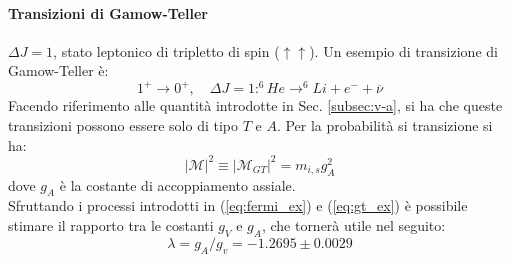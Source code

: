\documentclass{subnucbo}
\begin{document}
\paragraph{Transizioni di Gamow-Teller} $\Delta J=1$, stato leptonico di tripletto di spin ($\uparrow\uparrow$). Un esempio di transizione di Gamow-Teller è:
\begin{equation}
        1 ^ { + } \rightarrow 0 ^ { + } , \quad \Delta J = 1 : ^{6}H e \rightarrow^ { 6 } L i + e ^ { - } + \overline { \nu }
        \label{eq:gt_ex}
\end{equation}
Facendo riferimento alle quantità introdotte in Sec. \ref{subsec:v-a}, si ha che queste transizioni possono essere solo di tipo $T$ e $A$. Per la probabilità si transizione si ha:
\begin{equation}
        | \mathcal { M } | ^ { 2 } \equiv \left| \mathcal { M } _ { G T } \right| ^ { 2 } = m _ { i , s } g _ { A } ^ { 2 }
        \label{eq:m_gt}
\end{equation}
dove $g_{A}$ è la costante di accoppiamento assiale. \\
Sfruttando i processi introdotti in (\ref{eq:fermi_ex}) e (\ref{eq:gt_ex}) è possibile stimare \cite{ref:BGSex} il rapporto tra le costanti $g_{V}$ e $g_{A}$, che tornerà utile nel seguito:
\begin{equation}
        \lambda = g _ { A } / g _ { v } = - 1.2695 \pm 0.0029
        \label{eq:ga_gv}
\end{equation}
\end{document}
